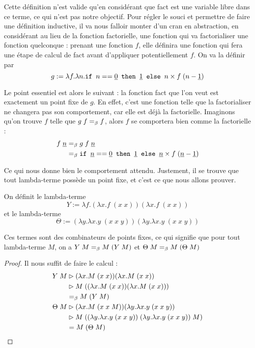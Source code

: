 Cette définition n'est valide qu'en considérant que fact est une variable libre dans ce terme, ce qui n'est pas notre objectif. Pour régler le souci et permettre de faire une définition inductive, il va nous falloir monter d'un cran en abstraction, en considérant au lieu de la fonction factorielle, une fonction qui va \og factorialiser\fg{} une fonction quelconque : prenant une fonction $f$, elle définira une fonction qui fera une étape de calcul de fact avant d'appliquer potentiellement $f$. On va la définir par $$g := \lambda f.\lambda n.\texttt{if } n == \underline 0 \texttt{ then } \underline 1\texttt{ else }n\times f\;(n-\underline 1)$$

Le point essentiel est alors le suivant : la fonction fact que l'on veut est exactement un point fixe de $g$. En effet, c'est une fonction telle que la factorialiser ne changera pas son comportement, car elle est déjà la factorielle. Imaginons qu'on trouve $f$ telle que $g\;f =_\beta f$, alors $f$ se comportera bien comme la factorielle :
\begin{align*}
    f\;\underline n&=_\beta g\;f\;\underline n\\
    &=_\beta \texttt{if } \underline n == \underline 0 \texttt{ then } \underline 1\texttt{ else }\underline n \times f\;(\underline n - \underline 1)
\end{align*}

Ce qui nous donne bien le comportement attendu. Justement, il se trouve que tout lambda-terme possède un point fixe, et c'est ce que nous allons prouver.

\begin{defi}
    On définit le lambda-terme $$Y := \lambda f.(\lambda x.f\;(x\;x))(\lambda x.f\;(x\;x))$$ et le lambda-terme $$\Theta := (\lambda y.\lambda x.y\;(x\;x\;y))(\lambda y.\lambda x.y\;(x\;x\;y))$$

    Ces termes sont des combinateurs de points fixes, ce qui signifie que pour tout lambda-terme $M$, on a $Y\;M=_\beta M\;(Y\;M)$ et $\Theta\;M =_\beta M\;(\Theta\;M)$
\end{defi}

\begin{proof}
    Il nous suffit de faire le calcul :
    \begin{align*}
        Y\;M &\rhd (\lambda x.M\;(x\;x))(\lambda x.M\;(x\;x))\\
        &\rhd M\;((\lambda x.M\;(x\;x))(\lambda x.M\;(x\;x)))\\
        &=_\beta M\;(Y\;M)\\
        \Theta\;M &\rhd (\lambda x.M\;(x\;x\;M))(\lambda y.\lambda x.y\;(x\;x\;y))\\
        &\rhd M\;((\lambda y.\lambda x.y\;(x\;x\;y))\;(\lambda y.\lambda x.y\;(x\;x\;y))\;M)\\
        &= M\;(\Theta\;M)
    \end{align*}
\end{proof}

